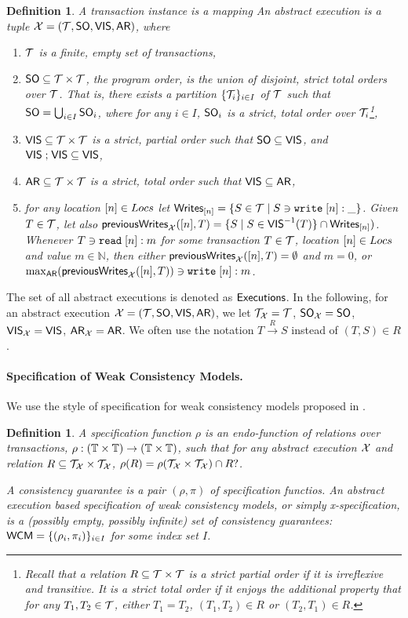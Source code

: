 \documentclass[a4paper,UKenglish]{article}%
\theoremstyle{plain}
\newtheorem{definition}[theorem]{Definition}
\begin{document}
\begin{definition}
A \emph{transaction instance} is a mapping
An abstract execution is a tuple $\mathcal{X} = (\mathcal{T}, {\sf{SO}}, {\mathsf{VIS}}, {\sf{AR}})$, where 
\begin{enumerate}
\item $\mathcal{T}$ is a finite, empty set of transactions, 
\item ${\sf{SO}} \subseteq \mathcal{T} \times \mathcal{T}$, the \emph{program order}, is the union 
of disjoint, strict total orders over $\mathcal{T}$. That is, there exists a partition $\{\mathcal{T}_i\}_{i \in I}$ 
of $\mathcal{T}$ such that ${\sf{SO}} = \bigcup_{i \in I} {\sf{SO}}_i$, where for any $i \in I$, ${\sf{SO}}_i$ is a strict, 
total order over $\mathcal{T}_i$\footnote{Recall that a relation $R \subseteq \mathcal{T} \times \mathcal{T}$ is a strict partial order 
if it is irreflexive and transitive. It is a strict total order if it enjoys the additional property that 
for any $T_1, T_2 \in \mathcal{T}$, either $T_1 = T_2$, $(T_1, T_2) \in R$ or $(T_2, T_1) \in R$.},
\item ${\mathsf{VIS}} \subseteq \mathcal{T} \times \mathcal{T}$ is a strict, partial order such that ${\sf{SO}} \subseteq {\mathsf{VIS}}$, and ${\mathsf{VIS}} \mathrel{;} {\mathsf{VIS}} \subseteq 
{\mathsf{VIS}}$,
\item ${\sf{AR}} \subseteq \mathcal{T} \times \mathcal{T}$ is a strict, total order such that ${\mathsf{VIS}} \subseteq {\sf{AR}}$,
\item for any location $[n] \in Locs$ let ${\sf{Writes}}_{[n]} = \{S \in \mathcal{T} \mid S \ni {{\tt write}}\;[n]:\_\}$. 
Given $T \in \mathcal{T}$, let also $\mathsf{previousWrites}_{\mathcal{X}}([n], T) = \{S \mid S \in {\mathsf{VIS}}^{-1}(T)\} \cap {\sf{Writes}}_{[n]})$. 
Whenever $T \ni {{\tt read}}\;[n]: m$ for some transaction $T \in \mathcal{T}$, location $[n] \in Locs$ and 
value $m \in \mathbb{N}$, then either $\mathsf{previousWrites}_{\mathcal{X}}([n], T) = \emptyset$ and $m = 0$, 
or $\max_{{\sf{AR}}}(\mathsf{previousWrites}_{\mathcal{X}}([n], T)) \ni {{\tt write}}\;[n]: m$.
\end{enumerate}
\end{definition}
The set of all abstract executions is denoted as ${\mathsf{Executions}}$.
In the following, for an abstract execution $\mathcal{X} = (\mathcal{T}, {\sf{SO}}, {\mathsf{VIS}}, {\sf{AR}})$, we let 
$\mathcal{T}_{\mathcal{X}} = \mathcal{T}$, ${\sf{SO}}_{\mathcal{X}} = {\sf{SO}}$, ${\mathsf{VIS}}_{\mathcal{X}} = {\mathsf{VIS}}$, ${\sf{AR}}_{\mathcal{X}} = {\sf{AR}}$. 
We often use the notation $T \xrightarrow{R} S$ instead of $(T,S) \in R$.

\paragraph{\textbf{Specification of Weak Consistency Models.}}
We use the style of specification for weak consistency models 
proposed in \cite{laws}. 

\begin{definition}
A specification function $\rho$ is an endo-function of relations over 
transactions, $\rho: (\mathbb{T} \times \mathbb{T}) \rightarrow (\mathbb{T} \times \mathbb{T})$,
such that for any abstract execution $\mathcal{X}$ and relation $R \subseteq \mathcal{T}_{\mathcal{X}} \times \mathcal{T}_{\mathcal{X}}$, 
$\rho(R) = \rho(\mathcal{T}_{\mathcal{X}} \times \mathcal{T}_{\mathcal{X}}) \cap R?$. 

A consistency guarantee is a pair $(\rho, \pi)$ of specification functios.
An abstract execution based specification of weak consistency models, or simply \emph{x-specification}, 
is a (possibly empty, possibly infinite) set of consistency guarantees: $\mathsf{WCM} = \{(\rho_i, \pi_i)\}_{i \in I}$ 
for some index set $I$.
\end{definition}
\end{document}
